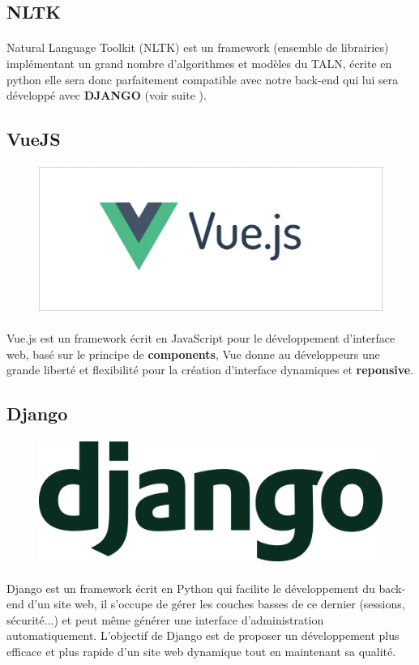 \documentclass[]{report}
\begin{document}
		\subsection{NLTK}
			\paragraph{}
			 Natural Language Toolkit (NLTK) est un framework (ensemble de librairies) implémentant un grand nombre d'algorithmes et modèles du TALN, écrite en python elle sera donc parfaitement compatible avec notre back-end qui lui sera développé avec \textbf{DJANGO} (voir suite ).
		\subsection{VueJS}
			\paragraph{}
			\begin{figure}[H]
				\centering
				\includegraphics[width=0.25\linewidth]{images/vjs.png}
			\end{figure}
			\paragraph{}
			Vue.js est un framework écrit en JavaScript pour le développement d'interface web, basé sur le principe de \textbf{components}, Vue donne au développeurs une grande liberté et flexibilité pour la création d'interface dynamiques
			et \textbf{reponsive}.
			
		\subsection{Django}
			\paragraph{}
			\begin{figure}[H]
				\centering
				\includegraphics[width=0.25\linewidth]{images/django.png}
			\end{figure}
			\paragraph{}
			Django est un framework écrit en Python qui facilite le développement du back-end d'un site web, il s'occupe de gérer les couches basses de ce dernier (sessions, sécurité...)   et peut même générer une interface d'administration automatiquement. L’objectif  de Django est de proposer un développement plus efficace et plus rapide d'un site web dynamique tout en maintenant sa qualité.
\end{document}

